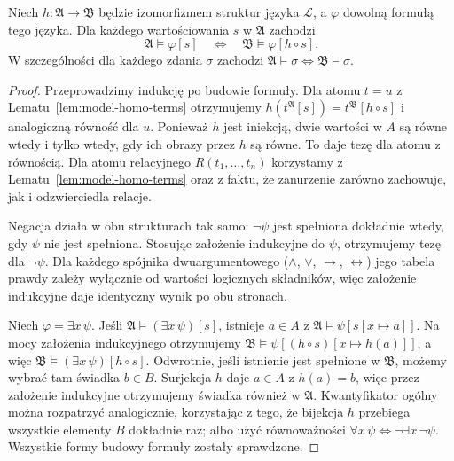 \begin{twierdzenie}\label{thm:model-iso-invariance}
Niech $h:\mathfrak A\to\mathfrak B$ będzie izomorfizmem
struktur języka $\mathcal L$, a $\varphi$ dowolną formułą
tego języka. Dla każdego wartościowania $s$ w $\mathfrak A$ zachodzi
\[
\mathfrak A\models\varphi[s]
\quad\Longleftrightarrow\quad
\mathfrak B\models\varphi[h\circ s].
\]
W szczególności dla każdego zdania $\sigma$ zachodzi
$\mathfrak A\models\sigma\iff\mathfrak B\models\sigma$.
\end{twierdzenie}
\begin{proof}
Przeprowadzimy indukcję po budowie formuły.
Dla atomu $t=u$ z Lematu~\ref{lem:model-homo-terms} otrzymujemy
$h(t^{\mathfrak A}[s])=t^{\mathfrak B}[h\circ s]$
i analogiczną równość dla $u$. Ponieważ $h$ jest iniekcją,
dwie wartości w $A$ są równe wtedy i tylko wtedy, gdy ich obrazy
przez $h$ są równe. To daje tezę dla atomu z równością.
Dla atomu relacyjnego $R(t_1,\ldots,t_n)$ korzystamy
z Lematu~\ref{lem:model-homo-terms} oraz z faktu,
że zanurzenie zarówno zachowuje, jak i odzwierciedla relacje.

Negacja działa w obu strukturach tak samo: $\neg\psi$ jest
spełniona dokładnie wtedy, gdy $\psi$ nie jest spełniona.
Stosując założenie indukcyjne do $\psi$, otrzymujemy tezę
dla $\neg\psi$. Dla każdego spójnika dwuargumentowego
($\land$, $\lor$, $\to$, $\leftrightarrow$) jego tabela prawdy
zależy wyłącznie od wartości logicznych składników,
więc założenie indukcyjne daje identyczny wynik po obu stronach.

Niech $\varphi=\exists x\,\psi$. Jeśli
$\mathfrak A\models(\exists x\,\psi)[s]$,
istnieje $a\in A$ z $\mathfrak A\models\psi[s[x\mapsto a]]$.
Na mocy założenia indukcyjnego otrzymujemy
$\mathfrak B\models\psi[(h\circ s)[x\mapsto h(a)]]$,
a więc $\mathfrak B\models(\exists x\,\psi)[h\circ s]$.
Odwrotnie, jeśli istnienie jest spełnione w $\mathfrak B$,
możemy wybrać tam świadka $b\in B$. Surjekcja $h$ daje
$a\in A$ z $h(a)=b$, więc przez założenie indukcyjne
otrzymujemy świadka również w $\mathfrak A$.
Kwantyfikator ogólny można rozpatrzyć analogicznie,
korzystając z tego, że bijekcja $h$ przebiega wszystkie elementy
$B$ dokładnie raz; albo użyć równoważności
$\forall x\,\psi\iff\neg\exists x\,\neg\psi$.
Wszystkie formy budowy formuły zostały sprawdzone.
\end{proof}

